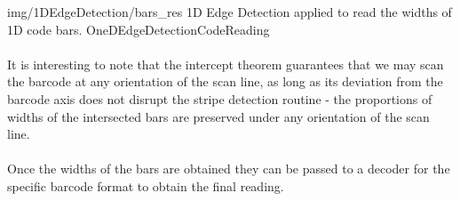 \oneFigure
{img/1DEdgeDetection/bars_res}
{1D Edge Detection applied to read the widths of 1D code bars.}
{OneDEdgeDetectionCodeReading}
{\basicWidth}

\paragraph*{}
It is interesting to note that the intercept theorem guarantees that we may scan the barcode at any orientation of the scan line, as long as its deviation from the barcode axis does not disrupt the stripe detection routine - the proportions of widths of the intersected bars are preserved under any orientation of the scan line.

\paragraph*{}
Once the widths of the bars are obtained they can be passed to a decoder for the specific barcode format to obtain the final reading.








